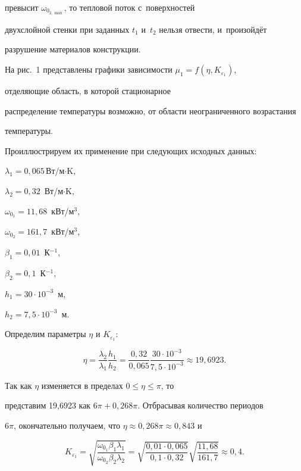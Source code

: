 превысит $\omega _{0_{2,\max} } $, то тепловой поток с~поверхностей

двухслойной стенки при заданных $t_1 $ и~$t_2 $ нельзя отвести, и~произойдёт

разрушение материалов конструкции.



На рис.~1 представлены графики зависимости $\mu _1 =f(\eta ,K_{\varepsilon _1 } )$,

отделяющие область, в которой стационарное

распределение температуры возможно, от области неограниченного возрастания

температуры. 

Проиллюстрируем их применение при следующих исходных данных:

\mbox{$\lambda _1 {=}0,065$\,Вт/м$\cdot$K,}

$\lambda _2 =0,32$~Вт/м$\cdot$K,

$\omega _{0_1 } =11,68$~кВт/м$^3$,

$\omega _{0_2 } =161,7$~кВт/м$^3$,

$\beta _1 =0,01$~К$^{-1}$,

$\beta _2 =0,1$~К$^{-1}$,

$h_1 =30\cdot 10^{-3}$~м,

$h_2 =7,5\cdot 10^{-3}$~м.



Определим параметры $\eta $ и $K_{\varepsilon _1 } $:

\[

\eta =\frac{\lambda _2 }{\lambda _1 }\frac{h_1 }{h_2

}=\frac{0,32}{0,065}\frac{30\cdot 10^{-3}}{7,5\cdot 10^{-3}}\approx

19,6923.

\]

Так как $\eta $ изменяется в пределах $0\leqslant \eta \leqslant \pi $, то

представим 19,6923 как $6\pi +0,268\pi $. Отбрасывая количество периодов

$6\pi $, окончательно получаем, что $\eta \approx 0,268\pi \approx 0,843$ и

\[

K_{\varepsilon _1 } =\sqrt {\frac{\omega _{0_1 } \beta _1 \lambda _1 }{\omega _{0_2 } \beta _2 \lambda _2 }} =

\sqrt {\frac{0,01\cdot 0,065}{0,1\cdot 0,32}} \sqrt {\frac{11,68 }{161,7}}

\approx 0,4.

\]



